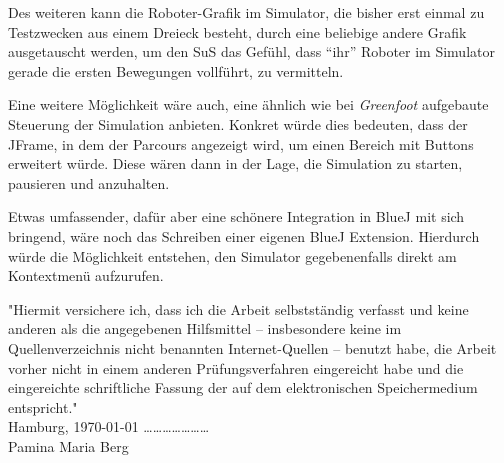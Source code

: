 \documentclass[paper=a4, DIV=14, BCOR=15mm, twoside=on, onecolumn=on, open = right, titlepage =on, parskip =half, headsepline = on, footsepline = on, chapterprefix = on, appendixprefix = off, fontsize = 12pt, numbers = noenddot, abstract = on]{scrbook}
\begin{document}
Des weiteren kann die Roboter-Grafik im Simulator, die bisher erst einmal zu Testzwecken aus einem Dreieck besteht, durch eine beliebige andere Grafik ausgetauscht werden, um den SuS das Gefühl, dass "`ihr"' Roboter im Simulator gerade die ersten Bewegungen vollführt, zu vermitteln.

Eine weitere Möglichkeit wäre auch, eine ähnlich wie bei \emph{Greenfoot} aufgebaute Steuerung der Simulation anbieten. Konkret würde dies bedeuten, dass der JFrame, in dem der Parcours angezeigt wird, um einen Bereich mit Buttons erweitert würde. Diese wären dann in der Lage, die Simulation zu starten, pausieren und anzuhalten.

Etwas umfassender, dafür aber eine schönere Integration in BlueJ mit sich bringend, wäre noch das Schreiben einer eigenen BlueJ Extension. Hierdurch würde die Möglichkeit entstehen, den Simulator gegebenenfalls direkt am Kontextmenü aufzurufen.

\newpage

\newpage
\thispagestyle{empty}
\vspace*{\fill}
"Hiermit versichere ich, dass ich die Arbeit selbstständig verfasst und keine anderen als die angegebenen Hilfsmittel – insbesondere keine im Quellenverzeichnis nicht benannten Internet-Quellen – benutzt habe, die Arbeit vorher nicht in einem anderen Prüfungsverfahren eingereicht habe und die eingereichte schriftliche Fassung der auf dem elektronischen Speichermedium entspricht."\\

Hamburg, \today \hspace*{\fill} \dots \dots \dots \dots \dots \dots \dots\\
\hspace*{\fill} Pamina Maria Berg $\,$
\end{document}
